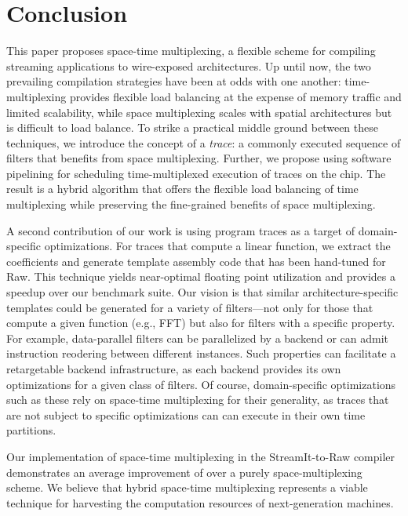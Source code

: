 \section{Conclusion}
\label{sec:conclusion}

This paper proposes space-time multiplexing, a flexible scheme for
compiling streaming applications to wire-exposed architectures.  Up
until now, the two prevailing compilation strategies have been at odds
with one another: time-multiplexing provides flexible load balancing
at the expense of memory traffic and limited scalability, while space
multiplexing scales with spatial architectures but is difficult to
load balance.  To strike a practical middle ground between these
techniques, we introduce the concept of a {\it trace}: a commonly
executed sequence of filters that benefits from space multiplexing.
Further, we propose using software pipelining for scheduling
time-multiplexed execution of traces on the chip.  The result is a
hybrid algorithm that offers the flexible load balancing of time
multiplexing while preserving the fine-grained benefits of space
multiplexing.

A second contribution of our work is using program traces as a target
of domain-specific optimizations.  For traces that compute a linear
function, we extract the coefficients and generate template assembly
code that has been hand-tuned for Raw.  This technique yields
near-optimal floating point utilization and provides a 
speedup over our benchmark suite.  Our vision is that similar
architecture-specific templates could be generated for a variety of
filters---not only for those that compute a given function (e.g., FFT)
but also for filters with a specific property.  For example,
data-parallel filters can be parallelized by a backend or can admit
instruction reodering between different instances.  Such properties
can facilitate a retargetable backend infrastructure, as each backend
provides its own optimizations for a given class of filters.  Of
course, domain-specific optimizations such as these rely on space-time
multiplexing for their generality, as traces that are not subject to
specific optimizations can can execute in their own time partitions.

Our implementation of space-time multiplexing in the StreamIt-to-Raw
compiler demonstrates an average improvement of  over a
purely space-multiplexing scheme.  We believe that hybrid space-time
multiplexing represents a viable technique for harvesting the
computation resources of next-generation machines.
